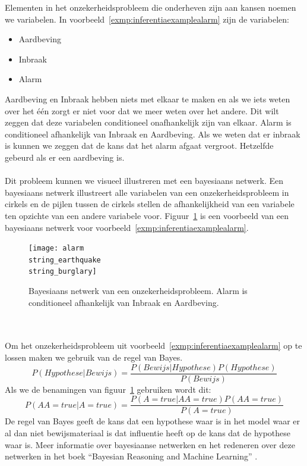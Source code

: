 \documentclass[12pt,a4paper,oneside]{book}
\theoremstyle{definition}
\newcommand{\quotes}[1]{``#1''}
\begin{document}
Elementen in het onzekerheidsprobleem die onderheven zijn aan kansen noemen we variabelen. In voorbeeld~\ref{exmp:inferentiaexamplealarm} zijn de variabelen:
\begin{itemize}
	\item Aardbeving
	\item Inbraak
	\item Alarm
\end{itemize}
Aardbeving en Inbraak hebben niets met elkaar te maken en als we iets weten over het \'{e}\'{e}n zorgt er niet voor dat we meer weten over het andere. Dit wilt zeggen dat deze variabelen conditioneel onafhankelijk zijn van elkaar. Alarm is conditioneel afhankelijk van Inbraak en Aardbeving. Als we weten dat er inbraak is kunnen we zeggen dat de kans dat het alarm afgaat vergroot. Hetzelfde gebeurd als er een aardbeving is.
\\\\
Dit probleem kunnen we visueel illustreren met een bayesiaans netwerk. Een bayesiaans netwerk illustreert alle variabelen van een onzekerheidsprobleem in cirkels en de pijlen tussen de cirkels stellen de afhankelijkheid van een variabele ten opzichte van een andere variabele voor. Figuur~\ref{figure:alarmearthquakeburglary} is een voorbeeld van een bayesiaans netwerk voor voorbeeld~\ref{exmp:inferentiaexamplealarm}. 
\begin{figure}
	\centering
	\texttt{[image: alarm\\string\_earthquake\\string\_burglary]}
	\caption{Bayesiaans netwerk van een onzekerheidsprobleem. Alarm is conditioneel afhankelijk van Inbraak en Aardbeving.}
	\label{figure:alarmearthquakeburglary}
\end{figure}
\\\\
Om het onzekerheidsprobleem uit voorbeeld~\ref{exmp:inferentiaexamplealarm} op te lossen maken we gebruik van de regel van Bayes.
\begin{equation} 
	\label{eq:bayesrule}
	P(Hypothese|Bewijs) = \frac{P(Bewijs|Hypothese)P(Hypothese)}{P(Bewijs)}
\end{equation}
Als we de benamingen van figuur~\ref{figure:alarmearthquakeburglary} gebruiken wordt dit:
\begin{equation} 
	\label{eq:bayesrule}
	P(AA=true|A=true) = \frac{P(A=true|AA=true)P(AA=true)}{P(A=true)}
\end{equation}
De regel van Bayes geeft de kans dat een hypothese waar is in het model waar er al dan niet bewijsmateriaal is dat influentie heeft op de kans dat de hypothese waar is. Meer informatie over bayesiaanse netwerken en het redeneren over deze netwerken in het boek \quotes{Bayesian Reasoning and Machine Learning} \cite{barberBRML2012}. 
\end{document}

